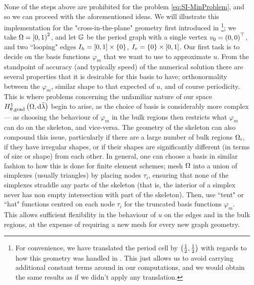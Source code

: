 None of the steps above are prohibited for the problem \eqref{eq:SI-MinProblem}, and so we can proceed with the aforementioned ideas.
We will illustrate this implementation for the "cross-in-the-plane" geometry first introduced in \footnote{For convenience, we have translated the period cell by $\left( \frac{1}{2},\frac{1}{2} \right)$ with regards to how this geometry was handled in . This just allows us to avoid carrying additional constant terms around in our computations, and we would obtain the same results as if we didn't apply any translation.}; we take $\Omega=\left[0,1\right)^2$, and let $\mathbb{G}$ be the period graph with a single vertex $v_0=\left( 0,0 \right)^\top$, and two ``looping" edges $I_h = \left[ 0,1 \right]\times\left\{ 0 \right\}$, $I_v=\left\{ 0 \right\}\times\left[ 0,1 \right]$.
Our first task is to decide on the basis functions $\varphi_m$ that we want to use to approximate $u$.
From the standpoint of accuracy (and typically speed) of the numerical solution there are several properties that it is desirable for this basis to have; orthonormality between the $\varphi_m$, similar shape to that expected of $u$, and of course periodicity.
This is where problems concerning the unfamiliar nature of our space $H^1_{\theta, \mathrm{grad}}\left( \Omega, \mathrm{d}\tilde{\lambda} \right)$ begin to arise, as the choice of basis is considerably more complex --- as choosing the behaviour of $\varphi_m$ in the bulk regions then restricts what $\varphi_m$ can do on the skeleton, and vice-versa. 
The geometry of the skeleton can also compound this issue, particularly if there are a large number of bulk regions $\Omega_i$, if they have irregular shapes, or if their shapes are significantly different (in terms of size or shape) from each other.
In general, one can choose a basis in similar fashion to how this is done for finite element schemes; mesh $\Omega$ into a union of simplexes (usually triangles) by placing nodes $\tau_i$, ensuring that none of the simplexes straddle any parts of the skeleton (that is, the interior of a simplex never has non empty intersection with part of the skeleton).
Then, use ``tent" or ``hat" functions centred on each node $\tau_i$ for the truncated basis functions $\varphi_m$.
This allows sufficient flexibility in the behaviour of $u$ on the edges and in the bulk regions, at the expense of requiring a new mesh for every new graph geometry.


